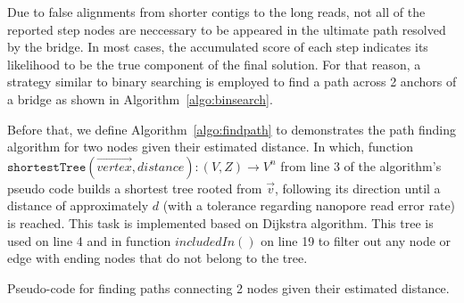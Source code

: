\documentclass[10pt,twocolumn,twoside]{genpaper}
\begin{document}
Due to false alignments from shorter contigs to the long reads, not all of the reported step nodes are neccessary to be appeared in the ultimate path resolved by the bridge. 
In most cases, the accumulated score of each step indicates its likelihood to be the true component of the final solution.
For that reason, a strategy similar to binary searching is employed to find a path across 2 anchors of a bridge as shown in Algorithm~\ref{algo:binsearch}.


Before that, we define Algorithm~\ref{algo:findpath} to demonstrates the path finding algorithm for two nodes given their estimated distance. In which, function 
$\mathtt{shortestTree}(\overrightarrow{vertex},distance) : (V,Z) \rightarrow V^n$ 
from line 3 of the algorithm's pseudo code builds a shortest tree rooted from $\overrightarrow{v}$, following its direction until a distance of approximately $d$ (with a tolerance regarding nanopore read error rate) is reached. This task is implemented based on Dijkstra algorithm.
This tree is used on line 4 and in function $includedIn()$ on line 19 to filter out any node or edge with ending nodes that do not belong to the tree.

\begin{algorithm}[!hpt]
\DontPrintSemicolon
{}
\caption{Pseudo-code for finding paths connecting 2 nodes given their estimated distance.}
\label{algo:findpath}
\end{algorithm}
\end{document}
